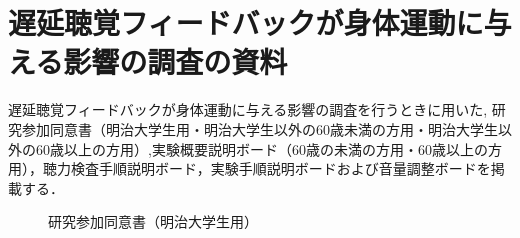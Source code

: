 \chapter{遅延聴覚フィードバックが身体運動に与える影響の調査の資料}
遅延聴覚フィードバックが身体運動に与える影響の調査を行うときに用いた,
研究参加同意書（明治大学生用・明治大学生以外の60歳未満の方用・明治大学生以外の60歳以上の方用）,実験概要説明ボード（60歳の未満の方用・60歳以上の方用），聴力検査手順説明ボード，実験手順説明ボードおよび音量調整ボードを掲載する．
\begin{figure}[ht]
	\centering
  \setlength{\fboxsep}{1pt} %
  \setlength{\fboxrule}{1pt} %
	\caption{研究参加同意書（明治大学生用）}
\end{figure}
